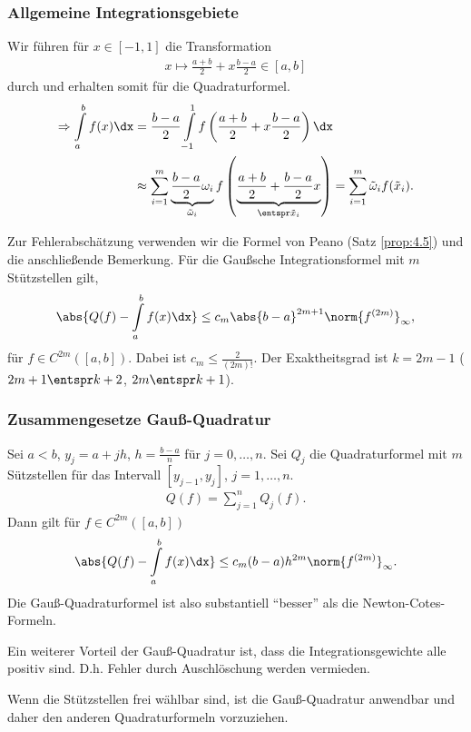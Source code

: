 \subsubsection{Allgemeine Integrationsgebiete}

Wir führen für $x\in[-1,1]$ die Transformation 
\begin{align*}
x\mapsto \frac{a+b}{2} + x\frac{b-a}{2} \in[a,b]
\end{align*}
durch und erhalten somit für die Quadraturformel.
\begin{align*}
\Rightarrow
\int\limits_a^b f(x)\dx &= \frac{b-a}{2} \int\limits_{-1}^1 f\left(\frac{a+b}{2}
+ x\frac{b-a}{2} \right)\dx \\ & \approx
\sum\limits_{i=1}^m \underbrace{\frac{b-a}{2}\omega_i}_{\tilde{\omega}_i}
f\left(\underbrace{ \frac{a+b}{2} + \frac{b-a}{2}x}_{\entspr \tilde{x}_i}\right)
= \sum\limits_{i=1}^m \tilde{\omega}_i f(\tilde{x}_i).
\end{align*}

Zur Fehlerabschätzung verwenden wir die Formel von Peano (Satz \ref{prop:4.5})
und die anschließende Bemerkung. Für die Gaußsche Integrationsformel mit $m$
Stützstellen gilt,
\begin{align*}
\abs{Q(f)-\int\limits_a^b f(x)\dx} \le c_m
\abs{b-a}^{2m+1}\norm{f^{(2m)}}_\infty,
\end{align*}
für $f\in C^{2m}([a,b])$. Dabei ist $c_m\le\frac{2}{(2m)!}$. Der Exaktheitsgrad
ist $k=2m-1$ ($2m+1 \entspr k+2$, $2m\entspr k+1$).

\subsubsection{Zusammengesetze Gauß-Quadratur}

Sei $a< b$, $y_j = a+jh$, $h=\frac{b-a}{n}$ für $j=0,\ldots,n$. Sei $Q_j$ die
Quadraturformel mit $m$ Sützstellen für das Intervall $[y_{j-1},y_j]$,
$j=1,\ldots,n$.
\begin{align*}
Q(f) = \sum\limits_{j=1}^n Q_j(f).
\end{align*}
Dann gilt für $f\in C^{2m}([a,b])$
\begin{align*}
\abs{Q(f)-\int\limits_a^b f(x)\dx} \le c_m (b-a) h^{2m}
\norm{f^{(2m)}}_\infty.
\end{align*}
Die Gauß-Quadraturformel ist also substantiell ``besser'' als die
Newton-Cotes-Formeln.

Ein weiterer Vorteil der Gauß-Quadratur ist, dass die Integrationsgewichte
alle positiv sind. D.h. Fehler durch Auschlöschung werden vermieden.

\begin{bemn}[Fazit.]
Wenn die Stützstellen frei wählbar sind, ist die Gauß-Quadratur anwendbar und
daher den anderen Quadraturformeln vorzuziehen.\maphere
\end{bemn}